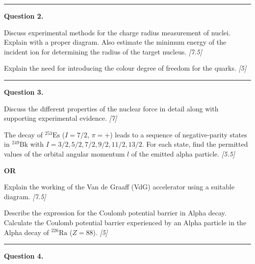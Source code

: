 \documentclass[11pt,a4paper]{article}
\newcommand{\pts}[1]{\hfill   \textit{[#1]}}
\begin{document}
\medskip\rule{\linewidth}{0.2pt}




\noindent   \textbf{Question 2.}

\begin{parts}
  \item Discuss experimental methods for the charge radius measurement of nuclei. Explain with a proper diagram. Also estimate the minimum energy of the incident ion for determining the radius of the target nucleus. \pts{7.5}
  \item Explain the need for introducing the colour degree of freedom for the quarks. \pts{5}
\end{parts}

\medskip\rule{\linewidth}{0.2pt}




\noindent   \textbf{Question 3.}

\begin{parts}
  \item Discuss the different properties of the nuclear force in detail along with supporting experimental evidence. \pts{7}
  \item The decay of $^{253} \text{Es}$ ($I = 7/2$, $\pi = +$) leads to a sequence of negative-parity states in $^{249} \text{Bk}$ with $I = 3/2, 5/2, 7/2, 9/2, 11/2, 13/2$. For each state, find the permitted values of the orbital angular momentum $l$ of the emitted alpha particle. \pts{5.5}
\end{parts}
\hfill   \textbf{OR}

\begin{parts}
  \item Explain the working of the Van de Graaff (VdG) accelerator using a suitable diagram. \pts{7.5}
  \item Describe the expression for the Coulomb potential barrier in Alpha decay. Calculate the Coulomb potential barrier experienced by an Alpha particle in the Alpha decay of $^{226} \text{Ra}$ ($Z = 88$). \pts{5}
\end{parts}

\medskip\rule{\linewidth}{0.2pt}




\noindent   \textbf{Question 4.}
\end{document}
